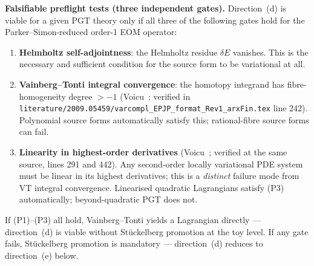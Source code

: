 \noindent
\textbf{Falsifiable preflight tests (three independent gates).}
Direction~(d) is viable for a given PGT theory only if all three of
the following gates hold for the Parker--Simon-reduced order-1 EOM
operator:
\begin{enumerate}
  \item[(P1)] \textbf{Helmholtz self-adjointness}: the Helmholtz
        residue $\delta E$ vanishes.  This is the necessary and
        sufficient condition for the source form to be variational at
        all.
  \item[(P2)] \textbf{Vainberg--Tonti integral convergence}: the
        homotopy integrand has fibre-homogeneity degree $> -1$
        (Voicu~\cite[Sec.~3.2]{Voicu2020}; verified in
        \texttt{literature/2009.05459/varcompl\_EPJP\_format\_Rev1\_arxFin.tex}
        line 242).  Polynomial source forms automatically satisfy this;
        rational-fibre source forms can fail.
  \item[(P3)] \textbf{Linearity in highest-order derivatives}
        (Voicu~\cite[Sec.~4 + App.~A]{Voicu2020}; verified at the same
        source, lines 291 and 442).  Any second-order locally variational
        PDE system must be linear in its highest derivatives; this is
        a \emph{distinct} failure mode from VT integral convergence.
        Linearised quadratic Lagrangians satisfy (P3) automatically;
        beyond-quadratic PGT does not.
\end{enumerate}
If (P1)--(P3) all hold, Vainberg--Tonti yields a Lagrangian
directly --- direction~(d) is viable without Stückelberg promotion at
the toy level.  If any gate fails, Stückelberg promotion is mandatory
--- direction~(d) reduces to direction~(e) below.

